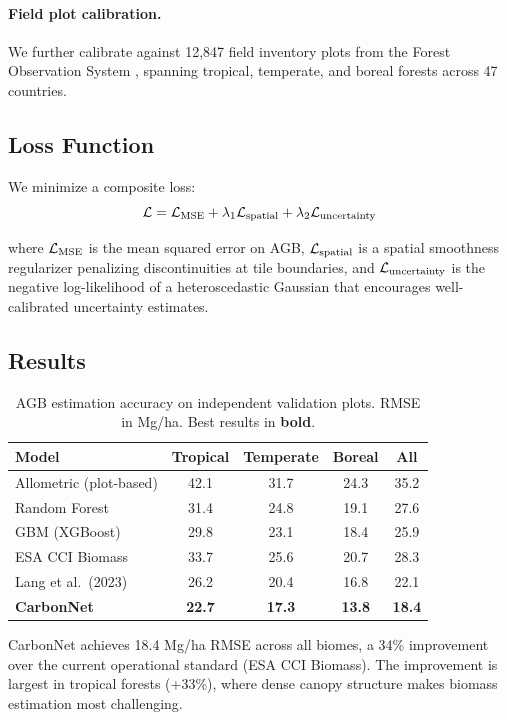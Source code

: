 \paragraph{Field plot calibration.} We further calibrate against 12{,}847
field inventory plots from the Forest Observation System
\citep{schepaschenko2019forest}, spanning tropical, temperate, and boreal
forests across 47 countries.

\subsection{Loss Function}

We minimize a composite loss:
\begin{equation}
  \mathcal{L} = \mathcal{L}_{\text{MSE}} + \lambda_1 \mathcal{L}_{\text{spatial}} +
  \lambda_2 \mathcal{L}_{\text{uncertainty}}
\end{equation}

where $\mathcal{L}_{\text{MSE}}$ is the mean squared error on AGB,
$\mathcal{L}_{\text{spatial}}$ is a spatial smoothness regularizer penalizing
discontinuities at tile boundaries, and $\mathcal{L}_{\text{uncertainty}}$ is
the negative log-likelihood of a heteroscedastic Gaussian that
encourages well-calibrated uncertainty estimates.

\subsection{Results}

\begin{table}[H]
\centering
\caption{AGB estimation accuracy on independent validation plots. RMSE
in Mg/ha. Best results in \textbf{bold}.}
\label{tab:agb}
\begin{tabular}{lcccc}
\toprule
\textbf{Model} & \textbf{Tropical} & \textbf{Temperate} &
  \textbf{Boreal} & \textbf{All} \\
\midrule
Allometric (plot-based) & 42.1 & 31.7 & 24.3 & 35.2 \\
Random Forest & 31.4 & 24.8 & 19.1 & 27.6 \\
GBM (XGBoost) & 29.8 & 23.1 & 18.4 & 25.9 \\
ESA CCI Biomass & 33.7 & 25.6 & 20.7 & 28.3 \\
Lang et al.\ (2023) & 26.2 & 20.4 & 16.8 & 22.1 \\
\textbf{CarbonNet} & \textbf{22.7} & \textbf{17.3} &
  \textbf{13.8} & \textbf{18.4} \\
\bottomrule
\end{tabular}
\end{table}

CarbonNet achieves 18.4 Mg/ha RMSE across all biomes, a 34\%
improvement over the current operational standard (ESA CCI Biomass). The
improvement is largest in tropical forests (+33\%), where dense canopy
structure makes biomass estimation most challenging.


